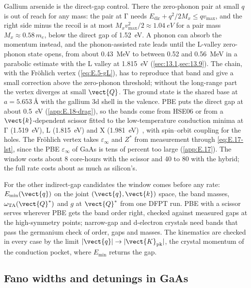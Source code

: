 Gallium arsenide is the direct-gap control. There the zero-phonon pair at small $q$ is out of reach for any mass: the pair at $\mathrm{\Gamma}$ needs $E_{\mathrm{dir}} + q^2/2M_x \le qv_{\mathrm{max}}$, and the right side minus the recoil is at most $M_xv_{\mathrm{max}}^2/2 \approx \SI{1.04}{eV}$ for a pair mass $M_x \approx 0.58\,m_e$, below the direct gap of \SI{1.52}{eV}. A phonon can absorb the momentum instead, and the phonon-assisted rate leads until the L-valley zero-phonon state opens, from about \SI{0.43}{MeV} to between 0.52 and \SI{0.56}{MeV} in a parabolic estimate with the L valley at \SI{1.815}{eV} (\cref{sec:13.1,sec:13.9}). The chain, with the Fr\"ohlich vertex (\cref{eq:E.5-gL}), has to reproduce that band and give a small correction above the zero-phonon threshold; without the long-range part the vertex diverges at small $\vect{Q}$. The ground state is the shared base at $a = \SI{5.653}{\angstrom}$ with the gallium 3d shell in the valence. PBE puts the direct gap at about \SI{0.5}{eV} (\cref{app:E.18-drag}), so the bands come from HSE06 or from a $\vect{k}$-dependent scissor fitted to the low-temperature conduction minima at $\mathrm{\Gamma}$ (\SI{1.519}{eV}), L (\SI{1.815}{eV}) and X (\SI{1.981}{eV})~\cite{vurgaftman2001band}, with spin--orbit coupling for the holes. The Fr\"ohlich vertex takes $\varepsilon_\infty$ and $Z^*$ from measurement through \cref{eq:E.17-lst}, since the PBE $\varepsilon_\infty$ of GaAs is tens of percent too large (\cref{app:E.17}). The window costs about 8 core-hours with the scissor and 40 to 80 with the hybrid; the full rate costs about as much as silicon's.

For the other indirect-gap candidates the window comes before any rate: $E_{\mathrm{min}}(\vect{q})$ on the joint $(\vect{q},\vect{k})$ space, the band masses, $\omega_{\mathrm{TA}}(\vect{Q}^*)$ and $g$ at $\vect{Q}^*$ from one DFPT run. PBE with a scissor serves wherever PBE gets the band order right, checked against measured gaps at the high-symmetry points; narrow-gap and d-electron crystals need bands that pass the germanium check of order, gaps and masses. The kinematics are checked in every case by the limit $|\vect{q}| \to |\vect{K}_{\mathrm{pk}}|$, the crystal momentum of the conduction pocket, where $E_{\mathrm{min}}$ returns the gap.

\subsection{Fano widths and detunings in GaAs}

